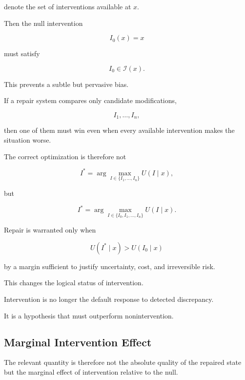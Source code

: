 \documentclass[11pt]{article}
\theoremstyle{remark}
\begin{document}
denote the set of interventions available at $x$.

Then the null intervention

\begin{equation}
I_0(x)=x
\end{equation}

must satisfy

\begin{equation}
I_0\in\mathcal{I}(x).
\end{equation}

This prevents a subtle but pervasive bias.

If a repair system compares only candidate modifications,

\begin{equation}
I_1,\ldots,I_n,
\end{equation}

then one of them must win even when every available intervention makes the situation worse.

The correct optimization is therefore not

\begin{equation}
I^\ast
=
\arg\max_{I\in\{I_1,\ldots,I_n\}}
U(I\mid x),
\end{equation}

but

\begin{equation}
I^\ast
=
\arg\max_{I\in\{I_0,I_1,\ldots,I_n\}}
U(I\mid x).
\end{equation}

Repair is warranted only when

\begin{equation}
U(I^\ast\mid x)
>
U(I_0\mid x)
\end{equation}

by a margin sufficient to justify uncertainty, cost, and irreversible risk.

This changes the logical status of intervention.

Intervention is no longer the default response to detected discrepancy.

It is a hypothesis that must outperform nonintervention.

\subsection{Marginal Intervention Effect}

The relevant quantity is therefore not the absolute quality of the repaired state but the marginal effect of intervention relative to the null.
\end{document}
